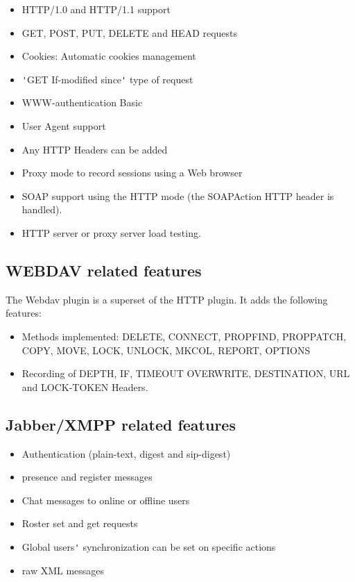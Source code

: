 \documentclass{IDXDOC-en}
\begin{document}
\begin{itemize}
\item HTTP/1.0 and HTTP/1.1 support
\item GET, POST, PUT, DELETE and HEAD requests
\item Cookies: Automatic cookies management
\item \verb|'|GET If-modified since\verb|'| type of request
\item WWW-authentication Basic
\item User Agent support
\item Any HTTP Headers can be added
\item Proxy mode to record sessions using a Web browser
\item SOAP support using the HTTP mode (the SOAPAction HTTP header is
  handled).
\item HTTP server or proxy server load testing.
\end{itemize}

\subsection{WEBDAV related features}

The Webdav plugin is a superset of the HTTP plugin. It adds the
following features:

\begin{itemize}
\item Methods implemented: DELETE, CONNECT, PROPFIND, PROPPATCH, COPY,
  MOVE, LOCK, UNLOCK, MKCOL, REPORT, OPTIONS
\item Recording of DEPTH, IF, TIMEOUT OVERWRITE, DESTINATION, URL and
  LOCK-TOKEN Headers.
\end{itemize}

\subsection{Jabber/XMPP related features}

\begin{itemize}
\item Authentication (plain-text, digest and sip-digest)
\item presence and register messages
\item Chat messages to online or offline users
\item Roster set and get requests
\item Global users\verb|'| synchronization can be set on specific actions
\item raw XML messages
\end{itemize}
\end{document}
